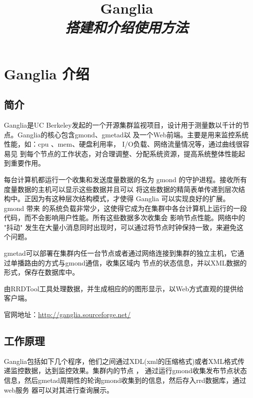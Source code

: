 \documentclass{article}
\begin{document}
\title{%
  {\huge \textsf{Ganglia}\\\smallskip}%
  {\small \textit{搭建和介绍使用方法}}
}

\author{
       }

\maketitle
\begin{multicols}{2}
\tableofcontents
\end{multicols}

\section{Ganglia 介绍}
\subsection{简介}
Ganglia是UC Berkeley发起的一个开源集群监视项目，设计用于测量数以千计的节点。Ganglia的核心包含gmond、gmetad以
及一个Web前端。主要是用来监控系统性能，如：cpu 、mem、硬盘利用率， I/O负载、网络流量情况等，通过曲线很容易见
到每个节点的工作状态，对合理调整、分配系统资源，提高系统整体性能起到重要作用。

每台计算机都运行一个收集和发送度量数据的名为 gmond 的守护进程。接收所有度量数据的主机可以显示这些数据并且可以
将这些数据的精简表单传递到层次结构中。正因为有这种层次结构模式，才使得 Ganglia 可以实现良好的扩展。gmond 带来
的系统负载非常少，这使得它成为在集群中各台计算机上运行的一段代码，而不会影响用户性能。所有这些数据多次收集会
影响节点性能。网络中的 "抖动" 发生在大量小消息同时出现时，可以通过将节点时钟保持一致，来避免这个问题。

gmetad可以部署在集群内任一台节点或者通过网络连接到集群的独立主机，它通过单播路由的方式与gmond通信，收集区域内
节点的状态信息，并以XML数据的形式，保存在数据库中。

由RRDTool工具处理数据，并生成相应的的图形显示，以Web方式直观的提供给客户端。

官网地址：\url{http://ganglia.sourceforge.net/}

\subsection{工作原理}
Ganglia包括如下几个程序，他们之间通过XDL(xml的压缩格式)或者XML格式传递监控数据，达到监控效果。集群内的节点 ，
通过运行gmond收集发布节点状态信息，然后gmetad周期性的轮询gmond收集到的信息，然后存入rrd数据库，通过web服务
器可以对其进行查询展示。
\end{document}
